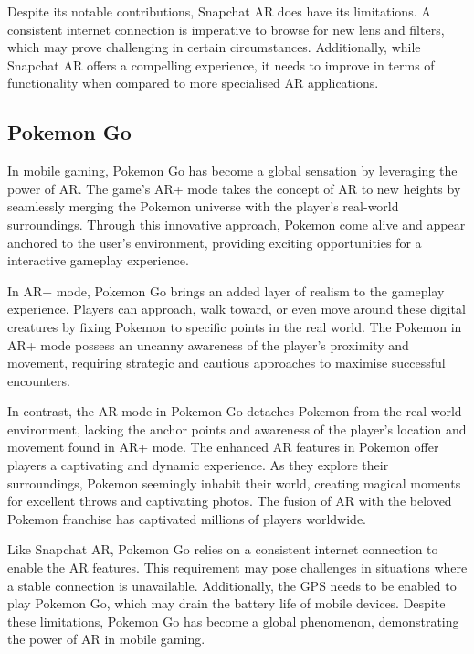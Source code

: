 Despite its notable contributions, Snapchat \ac{AR} does have its limitations. A consistent internet connection is imperative to browse for new lens and filters, which may prove challenging in certain circumstances. Additionally, while Snapchat \ac{AR} offers a compelling experience, it needs to improve in terms of functionality when compared to more specialised \ac{AR} applications.

\subsection*{Pokemon Go}
In mobile gaming, Pokemon Go has become a global sensation by leveraging the power of \ac{AR}. The game's \ac{AR}+\cite{AR+} mode takes the concept of \ac{AR} to new heights by seamlessly merging the Pokemon universe with the player's real-world surroundings. Through this innovative approach, Pokemon come alive and appear anchored to the user's environment, providing exciting opportunities for a interactive gameplay experience.

In \ac{AR}+ mode, Pokemon Go brings an added layer of realism to the gameplay experience. Players can approach, walk toward, or even move around these digital creatures by fixing Pokemon to specific points in the real world. The Pokemon in \ac{AR}+ mode possess an uncanny awareness of the player's proximity and movement, requiring strategic and cautious approaches to maximise successful encounters.

In contrast, the \ac{AR} mode in Pokemon Go detaches Pokemon from the real-world environment, lacking the anchor points and awareness of the player's location and movement found in AR+ mode.
The enhanced \ac{AR} features in Pokemon offer players a captivating and dynamic experience. As they explore their surroundings, Pokemon seemingly inhabit their world, creating magical moments for excellent throws and captivating photos. The fusion of \ac{AR} with the beloved Pokemon franchise has captivated millions of players worldwide.

Like Snapchat AR, Pokemon Go relies on a consistent internet connection to enable the \ac{AR} features. This requirement may pose challenges in situations where a stable connection is unavailable. Additionally, the GPS needs to be enabled to play Pokemon Go, which may drain the battery life of mobile devices. Despite these limitations, Pokemon Go has become a global phenomenon, demonstrating the power of \ac{AR} in mobile gaming.